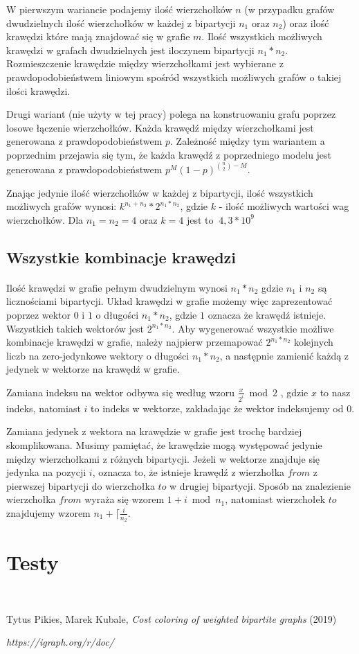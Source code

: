 \documentclass{article}
\begin{document}
W pierwszym wariancie podajemy ilość wierzchołków $n$ (w przypadku grafów dwudzielnych ilość wierzchołków w każdej z bipartycji $n_1$ oraz $n_2$) oraz ilość krawędzi które mają znajdować się w grafie $m$. Ilość wszystkich możliwych krawędzi w grafach dwudzielnych jest iloczynem bipartycji $n_1 * n_2$. Rozmieszczenie krawędzie między wierzchołkami jest wybierane z prawdopodobieństwem liniowym spośród wszystkich możliwych grafów o takiej ilości krawędzi.

Drugi wariant (nie użyty w tej pracy) polega na konstruowaniu grafu poprzez losowe łączenie wierzchołków. Każda krawędź między wierzchołkami jest generowana z prawdopodobieństwem $p$. Zależność między tym wariantem a poprzednim przejawia się tym, że każda krawędź z poprzedniego modelu jest generowana z prawdopodobieństwem $p^M(1-p)^{{n \choose 2}-M}$.

Znając jedynie ilość wierzchołków w każdej z bipartycji, ilość wszystkich możliwych grafów wynosi: $k^{n_1+n_2}*2^{n_1*n_2}$, gdzie $k$ - ilość możliwych wartości wag wierzchołków. Dla $n_1=n_2=4$ oraz $k=4$ jest to $~4,3*10^9$

\subsection{Wszystkie kombinacje krawędzi}

\paragraph{} Ilość krawędzi w grafie pełnym dwudzielnym wynosi $n_1 * n_2$ gdzie $n_1$ i $n_2$ są licznościami bipartycji. Układ krawędzi w grafie możemy więc zaprezentować poprzez wektor $0$ i $1$ o długości $n_1 * n_2$, gdzie $1$ oznacza że krawędź istnieje. Wszystkich takich wektorów jest $2^{n_1*n_2}$. Aby wygenerować wszystkie możliwe kombinacje krawędzi w grafie, należy najpierw przemapować $2^{n_1*n_2}$ kolejnych liczb na zero-jedynkowe wektory o długości $n_1 * n_2$, a następnie zamienić każdą z jedynek w wektorze na krawędź w grafie. 

Zamiana indeksu na wektor odbywa się według wzoru $\frac{x}{2^{i}}\bmod 2$ , gdzie $x$ to nasz indeks, natomiast $i$ to indeks w wektorze, zakładając że wektor indeksujemy od $0$.

Zamiana jedynek z wektora na krawędzie w grafie jest trochę bardziej skomplikowana. Musimy pamiętać, że krawędzie mogą występować jedynie między wierzchołkami z różnych bipartycji. Jeżeli w wektorze znajduje się jedynka na pozycji $i$, oznacza to, że istnieje krawędź z wierzhołka $from$ z pierwszej bipartycji do wierzchołka $to$ w drugiej bipartycji. Sposób na znalezienie wierzchołka $from$ wyraża się wzorem $1 + i\bmod n_1$, natomiast wierzchołek $to$ znajdujemy wzorem $n_1 + \lceil{\frac{i}{n_2}}$.

\section{Testy}

\

\begin{thebibliography}{9}

Tytus Pikies, Marek Kubale,
\emph{Cost coloring of weighted bipartite graphs}
(2019)

\emph{https://igraph.org/r/doc/}

\end{thebibliography}
\end{document}
